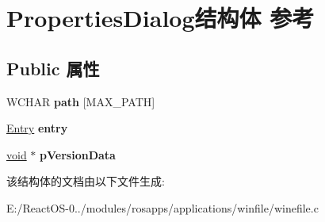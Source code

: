 \hypertarget{struct_properties_dialog}{}\section{Properties\+Dialog结构体 参考}
\label{struct_properties_dialog}
\subsection*{Public 属性}
\begin{DoxyCompactItemize}
\item 
\mbox{\label{struct_properties_dialog_adc529b8d45e4f94c9d7008056b949d6e}} 
W\+C\+H\+AR {\bfseries path} \mbox{[}M\+A\+X\+\_\+\+P\+A\+TH\mbox{]}
\item 
\mbox{\label{struct_properties_dialog_a6255b70997a15d0900c25617297f52a8}} 
\hyperlink{struct_entry}{Entry} {\bfseries entry}
\item 
\mbox{\label{struct_properties_dialog_ab2bb923a846698106cdd5f24e167da10}} 
\hyperlink{interfacevoid}{void} $\ast$ {\bfseries p\+Version\+Data}
\end{DoxyCompactItemize}


该结构体的文档由以下文件生成\+:\begin{DoxyCompactItemize}
\item 
E\+:/\+React\+O\+S-\/0../modules/rosapps/applications/winfile/winefile.\+c\end{DoxyCompactItemize}
